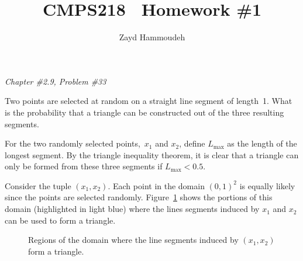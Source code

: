 \documentclass{report}
\title{\textbf{CMPS218 \textendash\ Homework \#1}}
\author{Zayd Hammoudeh}
\newcounter{subProbCount}       %
\newenvironment{problemshell}{
  \par%
  \medskip
  \leftskip=0pt\rightskip=0pt%
}
{
  \par\medskip
  \setcounter{subProbCount}{1} %
}
\newenvironment{problem}[3]
{%
  \begin{problemshell}
    \noindent \textit{Chapter \##1.#2, Problem \##3} \\
    \bfseries
}
{
  \end{problemshell}
}
\begin{document}
  \maketitle

  \begin{problem}{2}{9}{33}
    Two points are selected at random on a straight line segment of length~1.  What is the probability that a triangle can be constructed out of the three resulting segments.
  \end{problem}

  For the two randomly selected points,~$x_1$ and $x_2$, define $L_{\max}$ as the length of the longest segment.  By the triangle inequality theorem, it is clear that a triangle can only be formed from these three segments if ${L_{\max} < 0.5}$.


  Consider the tuple ${(x_1,x_2)}$. Each point in the domain $(0,1)^2$ is equally likely since the points are selected randomly.  Figure~\ref{fig:problem2.9.33} shows the portions of this domain (highlighted in light blue) where the lines segments induced by $x_1$ and $x_2$ can be used to form a triangle.

  \begin{figure}[h]
    \centering
    \caption{Regions of the domain where the line segments induced by $(x_1,x_2)$ form a triangle.}\label{fig:problem2.9.33}
  \end{figure}
\end{document}
